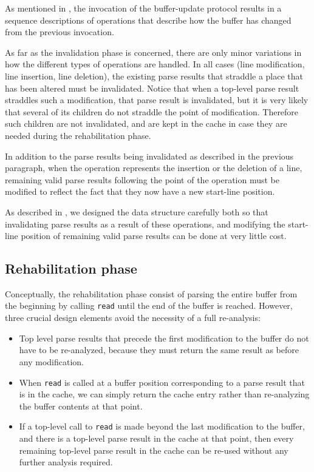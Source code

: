 As mentioned in , the invocation of
the buffer-update protocol results in a sequence descriptions of
operations that describe how the buffer has changed from the previous
invocation.

As far as the invalidation phase is concerned, there are only minor
variations in how the different types of operations are handled.  In
all cases (line modification, line insertion, line deletion), the
existing parse results that straddle a place that has been altered
must be invalidated.  Notice that when a top-level parse result
straddles such a modification, that parse result is invalidated, but
it is very likely that several of its children do not straddle the
point of modification.  Therefore such children are not invalidated,
and are kept in the cache in case they are needed during the
rehabilitation phase.

In addition to the parse results being invalidated as described in the
previous paragraph, when the operation represents the insertion or the
deletion of a line, remaining valid parse results following the point
of the operation must be modified to reflect the fact that they now
have a new start-line position.

As described in , we designed the
data structure carefully both so that invalidating parse results as a
result of these operations, and modifying the start-line position of
remaining valid parse results can be done at very little cost.

\subsection{Rehabilitation phase}

Conceptually, the rehabilitation phase consist of parsing the entire
buffer from the beginning by calling \texttt{read} until the end of
the buffer is reached.  However, three crucial design elements avoid
the necessity of a full re-analysis:

\begin{itemize}
\item Top level parse results that precede the first modification to
  the buffer do not have to be re-analyzed, because they must return
  the same result as before any modification.
\item When \texttt{read} is called at a buffer position corresponding
  to a parse result that is in the cache, we can simply return the
  cache entry rather than re-analyzing the buffer contents at that
  point.
\item If a top-level call to \texttt{read} is made beyond the last
  modification to the buffer, and there is a top-level parse result in
  the cache at that point, then every remaining top-level parse result
  in the cache can be re-used without any further analysis required.
\end{itemize}
